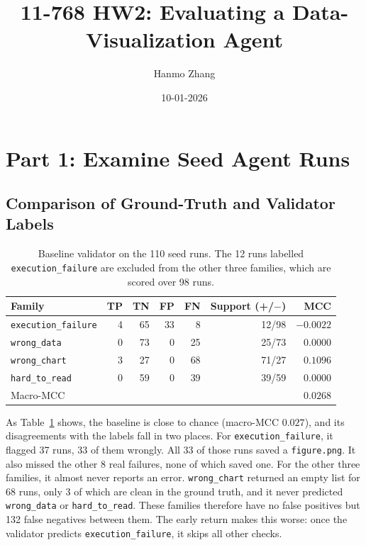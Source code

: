 \documentclass[11pt]{article}
\title{11-768 HW2: Evaluating a Data-Visualization Agent}
\author{Hanmo Zhang}
\date{10-01-2026}
\begin{document}
\maketitle

\section{Part 1: Examine Seed Agent Runs}

\subsection{Comparison of Ground-Truth and Validator Labels}

\begin{table}[h]
\centering
\begin{tabular}{lrrrrrr}
\toprule

Family & TP & TN & FP & FN & Support (+/$-$) & MCC \\
\midrule
\texttt{execution\_failure} & 4 & 65 & 33 & 8  & 12/98 & $-0.0022$ \\
\texttt{wrong\_data}        & 0 & 73 & 0  & 25 & 25/73 & $0.0000$ \\
\texttt{wrong\_chart}       & 3 & 27 & 0  & 68 & 71/27 & $0.1096$ \\
\texttt{hard\_to\_read}     & 0 & 59 & 0  & 39 & 39/59 & $0.0000$ \\
\midrule
\multicolumn{6}{l}{Macro-MCC} & $0.0268$ \\
\bottomrule
\end{tabular}
\caption{Baseline validator on the 110 seed runs. The 12 runs labelled
\texttt{execution\_failure} are excluded from the other three families, which
are scored over 98 runs.}
\label{tab:baseline}
\end{table}

As Table~\ref{tab:baseline} shows, the baseline is close to chance (macro-MCC
$0.027$), and its disagreements with the labels fall in two places. For
\texttt{execution\_failure}, it flagged 37 runs, 33 of them wrongly. All 33 of
those runs saved a \texttt{figure.png}. It also missed the other 8 real failures,
none of which saved one. For the other three families, it almost never reports an
error. \texttt{wrong\_chart} returned an empty list for 68 runs, only 3 of which are clean in the ground truth, and it never predicted \texttt{wrong\_data} or
\texttt{hard\_to\_read}. These families therefore have no false positives but
132 false negatives between them. The early return makes this worse: once the
validator predicts \texttt{execution\_failure}, it skips all other checks.
\end{document}
